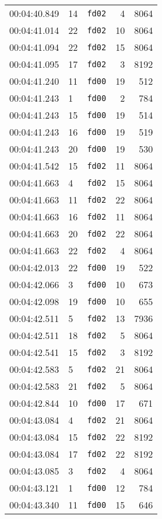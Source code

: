 \documentclass{article}
\begin{document}
\begin{longtable}{lllrr}
00:04:40.849 & 14 & \texttt{fd02} & 4 & 8064 \\
00:04:41.014 & 22 & \texttt{fd02} & 10 & 8064 \\
00:04:41.094 & 22 & \texttt{fd02} & 15 & 8064 \\
00:04:41.095 & 17 & \texttt{fd02} & 3 & 8192 \\
00:04:41.240 & 11 & \texttt{fd00} & 19 & 512 \\
00:04:41.243 & 1 & \texttt{fd00} & 2 & 784 \\
00:04:41.243 & 15 & \texttt{fd00} & 19 & 514 \\
00:04:41.243 & 16 & \texttt{fd00} & 19 & 519 \\
00:04:41.243 & 20 & \texttt{fd00} & 19 & 530 \\
00:04:41.542 & 15 & \texttt{fd02} & 11 & 8064 \\
00:04:41.663 & 4 & \texttt{fd02} & 15 & 8064 \\
00:04:41.663 & 11 & \texttt{fd02} & 22 & 8064 \\
00:04:41.663 & 16 & \texttt{fd02} & 11 & 8064 \\
00:04:41.663 & 20 & \texttt{fd02} & 22 & 8064 \\
00:04:41.663 & 22 & \texttt{fd02} & 4 & 8064 \\
00:04:42.013 & 22 & \texttt{fd00} & 19 & 522 \\
00:04:42.066 & 3 & \texttt{fd00} & 10 & 673 \\
00:04:42.098 & 19 & \texttt{fd00} & 10 & 655 \\
00:04:42.511 & 5 & \texttt{fd02} & 13 & 7936 \\
00:04:42.511 & 18 & \texttt{fd02} & 5 & 8064 \\
00:04:42.541 & 15 & \texttt{fd02} & 3 & 8192 \\
00:04:42.583 & 5 & \texttt{fd02} & 21 & 8064 \\
00:04:42.583 & 21 & \texttt{fd02} & 5 & 8064 \\
00:04:42.844 & 10 & \texttt{fd00} & 17 & 671 \\
00:04:43.084 & 4 & \texttt{fd02} & 21 & 8064 \\
00:04:43.084 & 15 & \texttt{fd02} & 22 & 8192 \\
00:04:43.084 & 17 & \texttt{fd02} & 22 & 8192 \\
00:04:43.085 & 3 & \texttt{fd02} & 4 & 8064 \\
00:04:43.121 & 1 & \texttt{fd00} & 12 & 784 \\
00:04:43.340 & 11 & \texttt{fd00} & 15 & 646 \\

\end{longtable}
\end{document}
